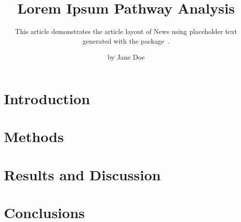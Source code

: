 
\title{Lorem Ipsum Pathway Analysis}
\subtitle{This article demonstrates the article layout of \WP News using
placeholder text generated with the  package~\cite{Lorem2026}.}
\author{by Jane Doe}

\maketitle

\section*{Introduction}
\lipsum[1-2]

\section*{Methods}
\lipsum[3]

\section*{Results and Discussion}
\lipsum[4]

\section*{Conclusions}
\lipsum[5]

\address{Jane Doe\\
}


